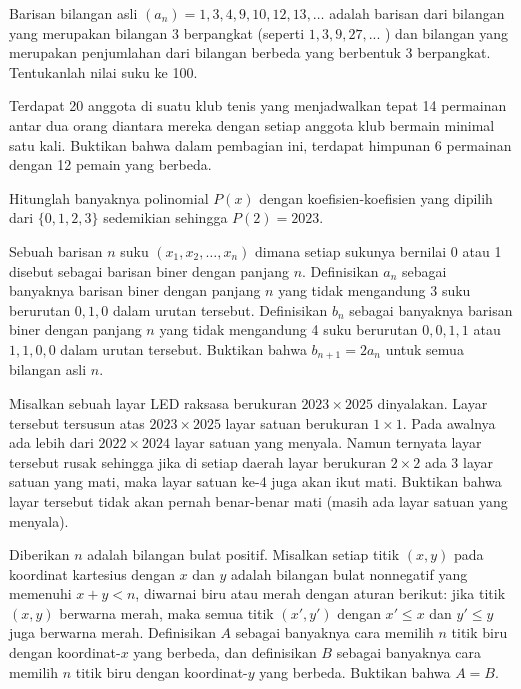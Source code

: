 \documentclass[12pt]{scrartcl}
\begin{document}
\begin{soaljawab}
Barisan bilangan asli $(a_n) = 1,3,4,9,10,12,13,\dots$ adalah barisan dari bilangan yang merupakan bilangan 3 berpangkat (seperti $1,3,9,27,...$ ) dan bilangan yang merupakan penjumlahan dari bilangan berbeda yang berbentuk 3 berpangkat. Tentukanlah nilai suku ke 100.
\end{soaljawab}

\begin{soaljawab}
Terdapat 20 anggota di suatu klub tenis yang menjadwalkan tepat 14 permainan antar dua orang diantara mereka dengan setiap anggota klub bermain minimal satu kali. Buktikan bahwa dalam pembagian ini, terdapat himpunan 6 permainan dengan 12 pemain yang berbeda.
\end{soaljawab}

\begin{soaljawab}
    Hitunglah banyaknya polinomial $P(x)$ dengan koefisien-koefisien yang dipilih dari $\{0, 1, 2, 3\}$ sedemikian sehingga $P(2) = 2023$.
\end{soaljawab}

\begin{soaljawab}
    Sebuah barisan $n$ suku $(x_1,x_2,\dots,x_n)$ dimana setiap sukunya bernilai 0 atau 1 disebut sebagai barisan biner dengan panjang $n$. Definisikan $a_n$ sebagai banyaknya barisan biner dengan panjang $n$ yang tidak mengandung 3 suku berurutan $0,1,0$ dalam urutan tersebut. Definisikan $b_n$ sebagai banyaknya barisan biner dengan panjang $n$ yang tidak mengandung 4 suku berurutan $0,0,1,1$ atau $1,1,0,0$  dalam urutan tersebut. Buktikan bahwa $b_{n+1} = 2a_{n}$ untuk semua bilangan asli $n$.
\end{soaljawab}

\begin{soaljawab}
    Misalkan sebuah layar LED raksasa berukuran $2023 \times 2025$ dinyalakan. Layar tersebut tersusun atas $2023 \times 2025$ layar satuan berukuran $1 \times 1$. Pada awalnya ada lebih dari $2022 \times 2024$ layar satuan yang menyala. Namun ternyata layar tersebut rusak sehingga jika di setiap daerah layar berukuran $2 \times 2$ ada 3 layar satuan yang mati, maka layar satuan ke-4 juga akan ikut mati. Buktikan bahwa layar tersebut tidak akan pernah benar-benar mati (masih ada layar satuan yang menyala).
\end{soaljawab}

\begin{soaljawab}
    Diberikan $n$ adalah bilangan bulat positif. Misalkan setiap titik $(x,y)$ pada koordinat kartesius dengan $x$ dan $y$ adalah bilangan bulat nonnegatif yang memenuhi $x+y < n$, diwarnai biru atau merah dengan aturan berikut: jika titik $(x,y)$ berwarna merah, maka semua titik $(x',y')$ dengan $x' \le x$ dan $y' \le y$ juga berwarna merah. Definisikan $A$ sebagai banyaknya cara memilih $n$ titik biru dengan koordinat-$x$ yang berbeda, dan definisikan $B$ sebagai banyaknya cara memilih $n$ titik biru dengan koordinat-$y$ yang berbeda. Buktikan bahwa $A=B$.
\end{soaljawab}
\end{document}
